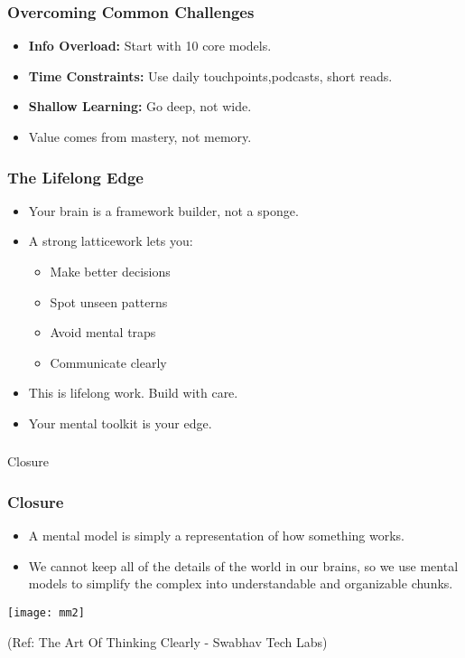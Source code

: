 \begin{frame}[fragile]\frametitle{Overcoming Common Challenges}
  \begin{itemize}
    \item \textbf{Info Overload:} Start with 10 core models.
    \item \textbf{Time Constraints:} Use daily touchpoints,podcasts, short reads.
    \item \textbf{Shallow Learning:} Go deep, not wide.
    \item Value comes from mastery, not memory.
  \end{itemize}
\end{frame}

\begin{frame}[fragile]\frametitle{The Lifelong Edge}
  \begin{itemize}
    \item Your brain is a framework builder, not a sponge.
    \item A strong latticework lets you:
      \begin{itemize}
        \item Make better decisions
        \item Spot unseen patterns
        \item Avoid mental traps
        \item Communicate clearly
      \end{itemize}
    \item This is lifelong work. Build with care.
    \item Your mental toolkit is your edge.
  \end{itemize}
\end{frame}


\begin{frame}[fragile]\frametitle{}
\begin{center}
{\Large Closure}
\end{center}
\end{frame}

\begin{frame}[fragile]\frametitle{Closure}
  \begin{itemize}
    \item A mental model is simply a representation of how something works. 
	\item We cannot keep all of the details of the world in our brains, so we use mental models to simplify the complex into understandable and organizable chunks.
  \end{itemize}
  
	\begin{center}
	\texttt{[image: mm2]}
	\end{center}
	
{\tiny (Ref: The Art Of Thinking Clearly - Swabhav Tech Labs)}  
\end{frame}

